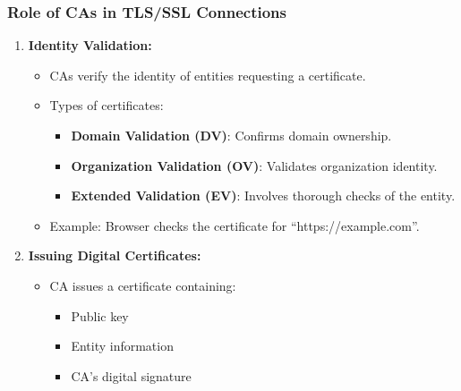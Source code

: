 \documentclass{beamer}
\begin{document}
\begin{frame}[fragile]
    \frametitle{Role of CAs in TLS/SSL Connections}
    \begin{enumerate}
        \item \textbf{Identity Validation:}
            \begin{itemize}
                \item CAs verify the identity of entities requesting a certificate.
                \item Types of certificates:
                    \begin{itemize}
                        \item \textbf{Domain Validation (DV)}: Confirms domain ownership.
                        \item \textbf{Organization Validation (OV)}: Validates organization identity.
                        \item \textbf{Extended Validation (EV)}: Involves thorough checks of the entity.
                    \end{itemize}
                \item Example: Browser checks the certificate for “https://example.com”.
            \end{itemize}
        \item \textbf{Issuing Digital Certificates:}
            \begin{itemize}
                \item CA issues a certificate containing:
                    \begin{itemize}
                        \item Public key
                        \item Entity information
                        \item CA's digital signature
                    \end{itemize}
            \end{itemize}
    \end{enumerate}
\end{frame}
\end{document}
